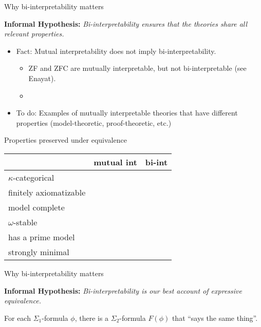 \documentclass[ignorenonframetext,fleqn]{beamer}
\newcommand{\2}{\mathcal}
\newcommand{\cmark}{\textcolor{green}{\ding{51}}} %
\begin{document}
\begin{frame}{Why bi-interpretability matters}

  \nocite{friedman2014bi} \nocite{freire}

  \textbf{Informal Hypothesis:} \textit{Bi-interpretability ensures
    that the theories share all relevant properties.}

  \vfill \begin{itemize}
  \item Fact: Mutual interpretability does not imply
    bi-interpretability.
    \begin{itemize}
    \item ZF and ZFC are mutually interpretable, but not
      bi-interpretable (see Enayat).
    \item {}
    \end{itemize}  
  \item To do: Examples of mutually interpretable theories that have
    different properties (model-theoretic, proof-theoretic, etc.)
  \end{itemize}

\end{frame}

\begin{frame}{Properties preserved under equivalence}


  \begin{center}
  \begin{tabular}{l|c|c}
    & mutual int & bi-int \\ \hline
    $\kappa$-categorical & & \cmark \\ \hline 
    finitely axiomatizable & & \cmark \\ \hline
    model complete & & \cmark \\ \hline
    $\omega$-stable & & \\ \hline 
    has a prime model & & \\ \hline 
    strongly minimal & & 
  \end{tabular}
  \end{center}



\end{frame}

\begin{frame}{Why bi-interpretability matters}

  \textbf{Informal Hypothesis:} \textit{Bi-interpretability is our
    best account of expressive equivalence.}

  \vfill For each $\Sigma _1$-formula $\phi$, there is a
  $\Sigma _2$-formula $F(\phi )$ that ``says the same thing''.

\end{frame}
\end{document}
